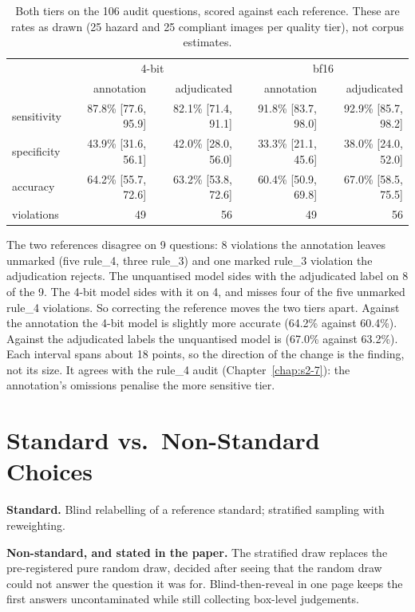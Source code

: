 \begin{table}[tbp]
\centering
\begin{tabular}{lrrrr}
\toprule
 & \multicolumn{2}{c}{4-bit} & \multicolumn{2}{c}{bf16} \\
 & annotation & adjudicated & annotation & adjudicated \\
\midrule
sensitivity & 87.8\% [77.6, 95.9] & 82.1\% [71.4, 91.1] & 91.8\% [83.7, 98.0] & 92.9\% [85.7, 98.2] \\
specificity & 43.9\% [31.6, 56.1] & 42.0\% [28.0, 56.0] & 33.3\% [21.1, 45.6] & 38.0\% [24.0, 52.0] \\
accuracy & 64.2\% [55.7, 72.6] & 63.2\% [53.8, 72.6] & 60.4\% [50.9, 69.8] & 67.0\% [58.5, 75.5] \\
violations & 49 & 56 & 49 & 56 \\
\bottomrule
\end{tabular}
\caption{Both tiers on the 106 audit questions, scored against each reference. These are rates as drawn
(25 hazard and 25 compliant images per quality tier), not corpus estimates.}
\label{tab:s26rescore}
\end{table}

The two references disagree on 9 questions: 8 violations the annotation leaves unmarked (five rule\_4,
three rule\_3) and one marked rule\_3 violation the adjudication rejects. The unquantised model sides with
the adjudicated label on 8 of the 9. The 4-bit model sides with it on 4, and misses four of the five
unmarked rule\_4 violations. So correcting the reference moves the two tiers apart. Against the
annotation the 4-bit model is slightly more accurate (64.2\% against 60.4\%). Against the adjudicated
labels the unquantised model is (67.0\% against 63.2\%). Each interval spans about 18 points, so the
direction of the change is the finding, not its size. It agrees with the rule\_4 audit
(Chapter~\ref{chap:s2-7}): the annotation's omissions penalise the more sensitive tier.

\section{Standard vs.\ Non-Standard Choices}

\textbf{Standard.} Blind relabelling of a reference standard; stratified sampling with reweighting.

\textbf{Non-standard, and stated in the paper.} The stratified draw replaces the pre-registered pure random
draw, decided after seeing that the random draw could not answer the question it was for. Blind-then-reveal
in one page keeps the first answers uncontaminated while still collecting box-level judgements.

